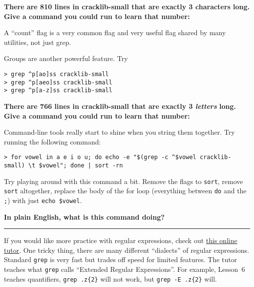 \documentclass{article}
\begin{document}
\medskip
\noindent
\textbf{There are 810 lines in cracklib-small that are exactly 3 characters
long. Give a command you could run to learn that number:}
\vspace{2cm}


\noindent
A ``count'' flag is a very common flag and very useful flag shared by many
utilities, not just grep.

\bigskip
\bigskip
\noindent
Groups are another powerful feature. Try
\begin{lstlisting}
> grep ^p[ao]ss cracklib-small
> grep ^p[aeo]ss cracklib-small
> grep ^p[a-z]ss cracklib-small
\end{lstlisting}

\medskip
\noindent
\textbf{There are 766 lines in cracklib-small that are exactly 3
\emph{letters} long. Give a command you could run to learn that number:}
\vspace{2cm}


\medskip
\noindent
Command-line tools really start to shine when you string them together.
Try running the following command:
\begin{lstlisting}
> for vowel in a e i o u; do echo -e "$(grep -c ^$vowel cracklib-small) \t $vowel"; done | sort -rn
\end{lstlisting}
Try playing around with this command a bit. Remove the flags to \texttt{sort},
remove \texttt{sort} altogether, replace the body of the for loop (everything
between \texttt{do} and the \texttt{;}) with just \texttt{echo \$vowel}.

\smallskip
\noindent
\textbf{In plain English, what is this command doing?}
\vspace{2cm}


\hrule
\smallskip
\noindent
{\footnotesize
  If you would like more practice with regular expressions, check out
  \href{http://regexone.com/}{this online tutor}. One tricky thing, there
  are many different ``dialects'' of regular expressions. Standard
  \texttt{grep} is very fast but trades off speed for limited features. The
  tutor teaches what \texttt{grep} calls ``Extended Regular Expressions''. For
  example, Lesson~6 teaches quantifiers, \texttt{grep .z\{2\}} will not work,
  but \texttt{grep -E .z\{2\}} will.
}
\end{document}
